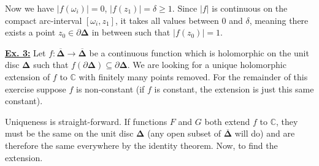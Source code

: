 \documentclass[a4paper, 12pt]{article} %
\newcommand{\C}{\mathbb{C}}
\newcommand{\closure}[1]{\overline{#1}}
\begin{document}
Now we have $|f(\omega_i)| = 0$, $|f(z_1)| = \delta \geq 1$. Since $|f|$ is continuous on the compact arc-interval $[\omega_i, z_1]$, it takes all values between $0$ and $\delta$, meaning there exists a point $z_0 \in \partial\mathbf{\Delta}$ in between such that $|f(z_0)| = 1$.
\newline

\underline{\textbf{Ex. 3:}}
Let $f\colon\closure{\mathbf{\Delta}}\to\closure{\mathbf{\Delta}}$ be a continuous function which is holomorphic on the unit disc $\mathbf{\Delta}$ such that $f(\partial\mathbf{\Delta}) \subseteq \partial\mathbf{\Delta}$. We are looking for a unique holomorphic extension of $f$ to $\C$ with finitely many points removed. For the remainder of this exercise suppose $f$ is non-constant (if $f$ is constant, the extension is just this same constant).

Uniqueness is straight-forward. If functions $F$ and $G$ both extend $f$ to $\C$, they must be the same on the unit disc $\mathbf{\Delta}$ (any open subset of $\closure{\mathbf{\Delta}}$ will do) and are therefore the same everywhere by the identity theorem. Now, to find the extension.
\end{document}

